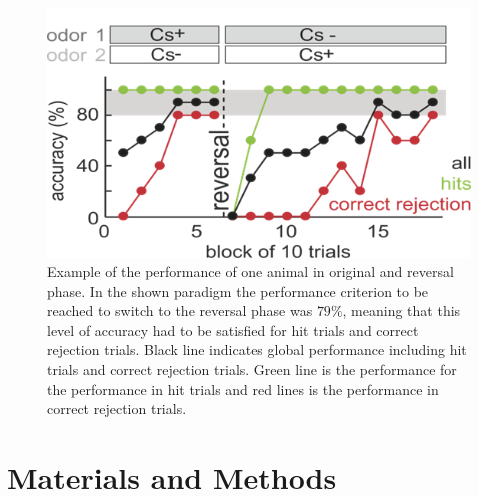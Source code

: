 \begin{figure}[H]
    \centering
\includegraphics[scale=0.8]{figures/Performance.png}
\caption{Example of the performance of one animal in original and reversal phase. In the shown paradigm the performance criterion to be reached to switch to the reversal phase was $79\%$, meaning that this level of accuracy had to be satisfied for hit trials and correct rejection trials. Black line indicates global performance including hit trials and correct rejection trials. Green line is the performance for the performance in hit trials and red lines is the performance in correct rejection trials.}
\label{fig:performance}
\end{figure}
\section{Materials and Methods}
\label{sec:MatAndMet}
